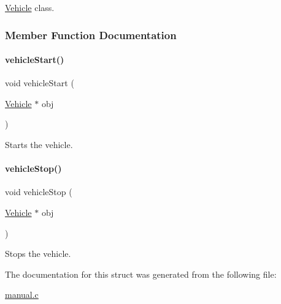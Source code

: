 \hyperlink{struct_vehicle}{Vehicle} class. 

\subsubsection{Member Function Documentation}
\hypertarget{struct_vehicle_a6891d3d28853bc3fdd075596dc6de9f8}{}\label{struct_vehicle_a6891d3d28853bc3fdd075596dc6de9f8} 
\paragraph{\texorpdfstring{vehicle\+Start()}{vehicleStart()}}
{\footnotesize\ttfamily void vehicle\+Start (\begin{DoxyParamCaption}\item[{\hyperlink{struct_vehicle}{Vehicle} $\ast$}]{obj }\end{DoxyParamCaption})}

Starts the vehicle. \hypertarget{struct_vehicle_a4dcbcba43792dcd673a552b14479ab77}{}\label{struct_vehicle_a4dcbcba43792dcd673a552b14479ab77} 
\paragraph{\texorpdfstring{vehicle\+Stop()}{vehicleStop()}}
{\footnotesize\ttfamily void vehicle\+Stop (\begin{DoxyParamCaption}\item[{\hyperlink{struct_vehicle}{Vehicle} $\ast$}]{obj }\end{DoxyParamCaption})}

Stops the vehicle. 

The documentation for this struct was generated from the following file\+:\begin{DoxyCompactItemize}
\item 
\hyperlink{manual_8c}{manual.\+c}\end{DoxyCompactItemize}
